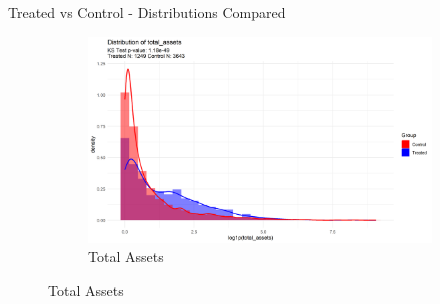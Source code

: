 \documentclass{beamer}
\begin{document}
    \begin{frame}{Treated vs Control - Distributions Compared}
        \begin{figure}[ht]
            \centering
            \begin{subfigure}[b]{0.45\textwidth}
                \includegraphics[width=\linewidth]{../Output/distrib_compare_total_assets_allcountries.png}
                \caption{Total Assets}


\end{subfigure}
\end{figure}
\end{frame}
\end{document}
